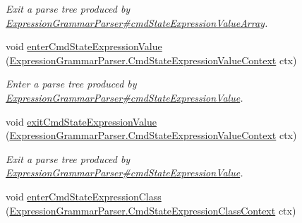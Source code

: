 \begin{DoxyCompactItemize}
\begin{DoxyCompactList}\small\item\em Exit a parse tree produced by \hyperlink{classgov_1_1nasa_1_1jpf_1_1inspector_1_1server_1_1expression_1_1parser_1_1_expression_grammar_parser_a5ca6781f2d54419c03ff89334158c305}{Expression\+Grammar\+Parser\#cmd\+State\+Expression\+Value\+Array}. \end{DoxyCompactList}\item 
void \hyperlink{interfacegov_1_1nasa_1_1jpf_1_1inspector_1_1server_1_1expression_1_1parser_1_1_expression_grammar_listener_a365a4d9d8f5e640fcc416046d601b319}{enter\+Cmd\+State\+Expression\+Value} (\hyperlink{classgov_1_1nasa_1_1jpf_1_1inspector_1_1server_1_1expression_1_1parser_1_1_expression_grammar_pa17ff9e538e96e94398ba5af02b5ffa30}{Expression\+Grammar\+Parser.\+Cmd\+State\+Expression\+Value\+Context} ctx)
\begin{DoxyCompactList}\small\item\em Enter a parse tree produced by \hyperlink{classgov_1_1nasa_1_1jpf_1_1inspector_1_1server_1_1expression_1_1parser_1_1_expression_grammar_parser_a9c38888905b31e514c2e4a695b8b2be6}{Expression\+Grammar\+Parser\#cmd\+State\+Expression\+Value}. \end{DoxyCompactList}\item 
void \hyperlink{interfacegov_1_1nasa_1_1jpf_1_1inspector_1_1server_1_1expression_1_1parser_1_1_expression_grammar_listener_a68a0f287cafdf34fdb92423e3d3768b9}{exit\+Cmd\+State\+Expression\+Value} (\hyperlink{classgov_1_1nasa_1_1jpf_1_1inspector_1_1server_1_1expression_1_1parser_1_1_expression_grammar_pa17ff9e538e96e94398ba5af02b5ffa30}{Expression\+Grammar\+Parser.\+Cmd\+State\+Expression\+Value\+Context} ctx)
\begin{DoxyCompactList}\small\item\em Exit a parse tree produced by \hyperlink{classgov_1_1nasa_1_1jpf_1_1inspector_1_1server_1_1expression_1_1parser_1_1_expression_grammar_parser_a9c38888905b31e514c2e4a695b8b2be6}{Expression\+Grammar\+Parser\#cmd\+State\+Expression\+Value}. \end{DoxyCompactList}\item 
void \hyperlink{interfacegov_1_1nasa_1_1jpf_1_1inspector_1_1server_1_1expression_1_1parser_1_1_expression_grammar_listener_a6a20251ace4dbfd38540eb4e6d50e06a}{enter\+Cmd\+State\+Expression\+Class} (\hyperlink{classgov_1_1nasa_1_1jpf_1_1inspector_1_1server_1_1expression_1_1parser_1_1_expression_grammar_pa672388ef0800b4a3d173ab7548f6b406}{Expression\+Grammar\+Parser.\+Cmd\+State\+Expression\+Class\+Context} ctx)

\end{DoxyCompactItemize}

